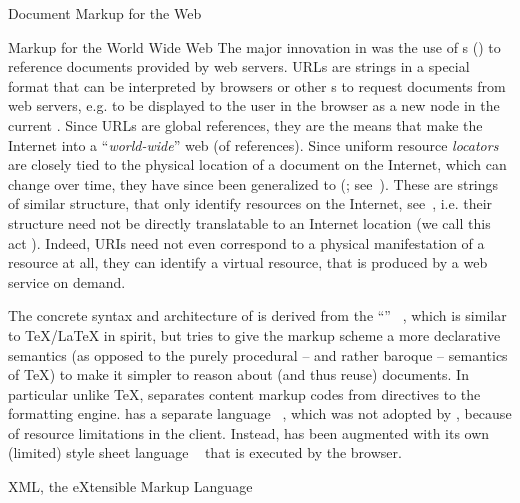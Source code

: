 \begin{omgroup}[id=markup-web]{Document Markup for the Web}
\begin{omgroup}[id=markup:www]{Markup for the World Wide Web}
The major innovation in {\html} was the use of {s}
({}) to reference documents provided by web servers. URLs are strings in a
special format that can be interpreted by browsers or other {s} to
request documents from web servers, e.g. to be displayed to the user in the browser as a
new node in the current {}. Since URLs are global references,
they are the means that make the Internet into a ``{\em{world-wide}}'' web (of
references).  Since uniform resource {\emph{locators}} are closely tied to the physical
location of a document on the Internet, which can change over time, they have since been
generalized to {} ({};
see~\cite{BerFie:uri98}). These are strings of similar structure, that only identify
resources on the Internet, see~\cite{Harold:xb01}, i.e. their structure need not be
directly translatable to an Internet location (we call this act
{}). Indeed, URIs need not even correspond to a physical
manifestation of a resource at all, they can identify a virtual resource, that is produced
by a web service on demand.

The concrete syntax and architecture of {\html} is derived from the ``{}'' {\sgml}~\cite{Goldfarb:sgml90}, which is similar to
{\TeX/LaTeX} in spirit, but tries to give the markup scheme a more declarative semantics
(as opposed to the purely procedural -- and rather baroque -- semantics of {\TeX}) to make
it simpler to reason about (and thus reuse) documents. In particular unlike {\TeX},
{\sgml} separates content markup codes from directives to the formatting engine.  {\sgml}
has a separate {} language {\dsssl}~\cite{DuCharme:fddsj97}, which
was not adopted by {\html}, because of resource limitations in the client. Instead,
{\html} has been augmented with its own (limited) style sheet language
{\css}~\cite{BosHak:css98} that is executed by the browser.
\end{omgroup}

\begin{omgroup}[id=xml]{XML, the eXtensible Markup Language}


\end{omgroup}
\end{omgroup}
